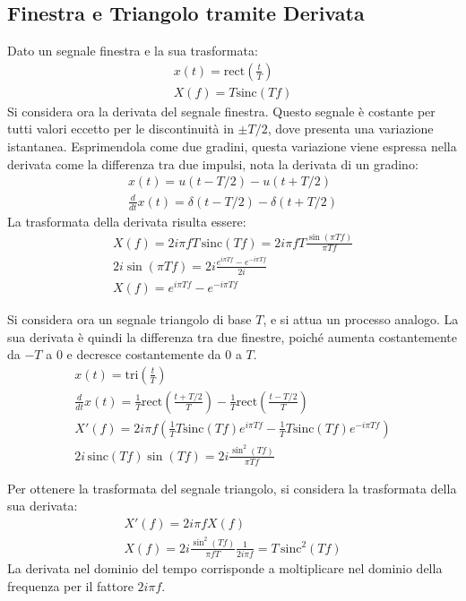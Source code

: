 \documentclass{article}
\numberwithin{equation}{subsection}
\begin{document}
\subsection{Finestra e Triangolo tramite Derivata}
Dato un segnale finestra e la sua trasformata:
\begin{gather*}
    x(t)=\mbox{rect}\displaystyle\left(\frac{t}{T}\right)\\
    X(f)=T\mbox{sinc}\displaystyle\left(Tf\right)
\end{gather*}
Si considera ora la derivata del segnale finestra. Questo segnale è costante per tutti valori eccetto per le discontinuità in $\pm T/2$, dove presenta una variazione istantanea. 
Esprimendola come due gradini, questa variazione viene espressa nella derivata come la differenza tra due impulsi, nota la derivata di un gradino: 
\begin{gather*}
    x(t)=u(t-T/2)-u(t+T/2)\\
    \displaystyle\frac{d}{dt}x(t)=\delta(t-T/2)-\delta(t+T/2)
\end{gather*}
La trasformata della derivata risulta essere:
\begin{gather*}
    X(f)=2i\pi fT\,\mbox{sinc}(Tf)=\displaystyle2i\pi fT\frac{\sin(\pi Tf)}{\pi Tf}\\
    2i\sin(\pi Tf)=2i\frac{e^{i\pi Tf}-e^{-i\pi Tf}}{2i}\\
    X(f)=e^{i\pi Tf}-e^{-i\pi Tf}
\end{gather*}


Si considera ora un segnale triangolo di base $T$, e si attua un processo analogo. La sua derivata è quindi la differenza tra due finestre, poiché aumenta costantemente da 
$-T$ a $0$ e decresce costantemente da $0$ a $T$. 
\begin{gather*}
    x(t)=\mbox{tri}\displaystyle\left(\frac{t}{T}\right)\\
    \displaystyle\frac{d}{dt}x(t)=\frac{1}{T}\mbox{rect}\left(\frac{t+T/2}{T}\right)-\frac{1}{T}\mbox{rect}\left(\frac{t-T/2}{T}\right)\\
    X'(f)=2i\pi f\displaystyle\left(\frac{1}{T}T\mbox{sinc}(Tf)e^{i\pi Tf}-\frac{1}{T}T\mbox{sinc}(Tf)e^{-i\pi Tf}\right)\\
    2i\,\mbox{sinc}(Tf)\sin(Tf)=\displaystyle2i\frac{\sin^2(Tf)}{\pi Tf}
\end{gather*}

Per ottenere la trasformata del segnale triangolo, si considera la trasformata della sua derivata:
\begin{gather*}
    X'(f)=2i\pi fX(f)\\
    X(f)=\displaystyle2i\frac{\sin^2(Tf)}{\pi fT}\frac{1}{2i\pi f}=T\,\mbox{sinc}^2(Tf)
\end{gather*}
La derivata nel dominio del tempo corrisponde a moltiplicare nel dominio della frequenza per il fattore $2i\pi f$. 
\end{document}
